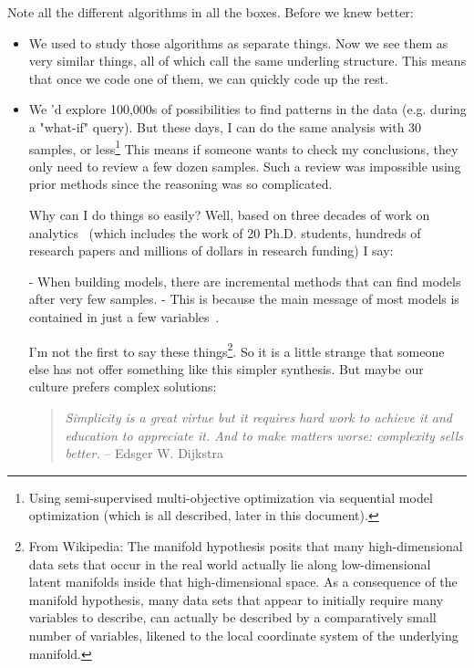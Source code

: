 \documentclass[landscape,	DIV=calc,%
							paper=letter,%
							fontsize=10pt,%
							twocolumn]{scrartcl}	 					%
\begin{document}
Note all the different algorithms in all the boxes.  Before we knew
better:
\begin{itemize}
    \item 
 We used to study those algorithms as separate  things. Now we see
them as very similar things, all of which call the same underling
structure. This means that  once we code one of them, we can quickly 
code up the rest. 
\item We 'd explore 100,000s of possibilities to find patterns in
the data (e.g. during a "what-if" query).  But these days, I can
do the same analysis with 30 samples, or 
less\footnote{Using semi-supervised multi-objective optimization via
sequential model optimization (which is all described, later in
this document).} 
This means
if someone wants to check my conclusions, they only need to review
a few dozen samples.  Such a review was impossible using prior
methods since the reasoning was so complicated.


Why can I do things so easily? Well,  based on three decades of work
on analytics~\cite{menzies1988combining} (which includes the work of 20 Ph.D. students,
hundreds of research papers and millions of dollars in research
funding) I say:

- When building models, there are incremental methods that can find
models after very few samples.
- This is because the main message of most models is contained in
just a few variables~\cite{menzies1988combining}.

I'm not the first to say these things\footnote{
From Wikipedia: The manifold hypothesis posits that many
high-dimensional data sets that occur in the real world actually
lie along low-dimensional latent manifolds inside that high-dimensional
space. As a consequence of the manifold hypothesis, many data sets
that appear to initially require many variables to describe, can
actually be described by a comparatively small number of variables,
likened to the local coordinate system of the underlying manifold.}.
So it is a little
strange that someone else has not offer something like this simpler
synthesis. But maybe our culture prefers complex solutions:

\begin{quote}{\em Simplicity is a great virtue but it requires hard work to achieve
it and education to appreciate it. And to make matters worse:
complexity sells better.}\newline
-- Edsger W. Dijkstra
\end{quote}


\end{itemize}
\end{document}

